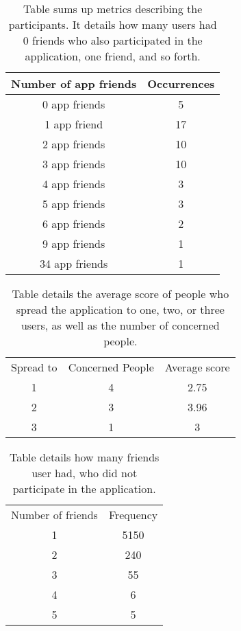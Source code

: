 \documentclass[preprint,12pt]{elsarticle}
\begin{document}
\newpage

 \begin{center}
 \begin{table}
 \begin{tabular}{ c c}
Number of app friends & Occurrences \\
\hline
0 app friends & 5 \\
1 app friend & 17 \\
2 app friends & 10 \\
3 app friends & 10 \\
4 app friends & 3 \\
5 app friends & 3\\
6 app friends & 2\\
9 app friends & 1\\
34 app friends & 1 \\
\end{tabular}
\caption{Table sums up metrics describing the participants. It
  details how many users had 0 friends who also participated in the
  application, one friend, and so forth.}
 \label{tab:nospread}
\end{table}
\end{center}

 \newpage

\begin{table}
\begin{tabular}{c c c}
Spread to & Concerned People & Average score \\ 
1&	4 & 2.75 \\
2&	3&3.96 \\
3&	1&3 \\
\end{tabular}
\caption{Table details the average score of people who spread the
  application to one, two, or three users, as well as the number of
  concerned people.}
\label{tab:scorespread}
\end{table}

\begin{table}
\begin{tabular}{c c}
Number of friends & Frequency \\
1& 5150\\
2& 240\\
3& 55\\
4& 6\\
5& 5\\
\end{tabular}
\caption{Table details how many friends user had, who did not
  participate in the application.}
\label{tab:nouser}
\end{table}
\end{document}
